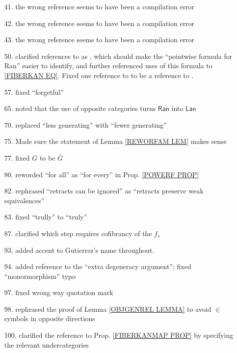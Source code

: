 \documentclass{article}
\begin{document}
\begin{itemize}
\item[41.] the wrong reference seems to have been a compilation error

\item[42.] the wrong reference seems to have been a compilation error

\item[43.] the wrong reference seems to have been a compilation error

\item[50.] clarified references to \cite[X.3.1]{McL} as \cite[X.3 Thm. 1]{McL}, which should make the ``pointwise formula for Ran'' easier to identify, and further referenced uses of this formula to \eqref{FIBERKAN EQ}.
Fixed one reference to \cite[X.3.1]{McL}
to be a reference to \cite[IX.3]{McL}.


\item[57.] fixed ``forgetful''

\item[65.] noted that the use of opposite categories turns $\mathsf{Ran}$ into $\mathsf{Lan}$

\item[70.] replaced ``less generating'' with ``fewer generating''

\item[75.] Made sure the statement of Lemma \ref{REWORFAM LEM} makes sense

\item[77.] fixed $G$ to be $\bar{G}$

\item[80.] reworded ``for all'' as ``for every'' in Prop. \ref{POWERF PROP}

\item[82.] rephrased ``retracts can be ignored''
as ``retracts preserve weak equivalences''

\item[83.] fixed ``trully'' to ``truly''

\item[87.] clarified which step requires cofibrancy of the 
$f_s$

\item[93.] added accent to Gutierrez's name throughout.

\item[94.] added \cite{Ri14} reference to the ``extra degeneracy argument''; fixed ``monormorphism'' typo

\item[97.] fixed wrong way quotation mark

\item[98.] rephrased the proof of Lemma \ref{OBJGENREL LEMMA}
to avoid $\in$ symbols in opposite directions

\item[100.] clarified the reference to Prop. \ref{FIBERKANMAP PROP} by specifying the relevant undercategories

\end{itemize}








{}


\end{document}
